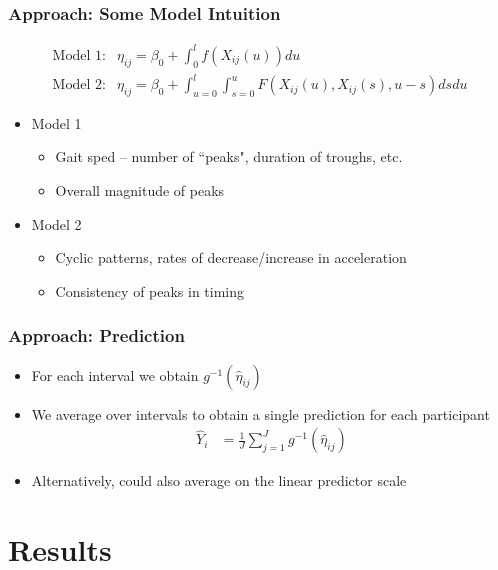 \documentclass[10pt]{beamer}\usepackage[]{graphicx}\usepackage[]{color}
\begin{document}
\begin{frame}
\frametitle{Approach: Some Model Intuition}
\begin{align*}
\text{Model 1:} & \eta_{ij} = \beta_0 + \int_0^l f(X_{ij}(u)) du \\
\text{Model 2:} &\eta_{ij} = \beta_0 + \int_{u=0}^l \int_{s=0}^u F(X_{ij}(u), X_{ij}(s), u-s)ds du 
\end{align*}
\begin{itemize}
\item Model 1  
    \begin{itemize}
    \item Gait sped -- number of ``peaks", duration of troughs, etc.
    \item Overall magnitude of peaks
    \end{itemize}
\item Model 2
    \begin{itemize}
    \item Cyclic patterns, rates of decrease/increase in acceleration 
    \item Consistency of peaks in timing
    \end{itemize}
\end{itemize}
\end{frame}

\begin{frame}
\frametitle{Approach: Prediction}
\begin{itemize}
\item For each interval we obtain $g^{-1}(\hat{\eta}_{ij})$
\item We average over intervals to obtain a single prediction for each participant
    \begin{align*}
    \hat{Y}_i &= \frac{1}{J}\sum_{j=1}^J g^{-1}(\hat{\eta}_{ij})
    \end{align*}
\item Alternatively, could also average on the linear predictor scale
\end{itemize}
\end{frame}



\section{Results}
\end{document}
